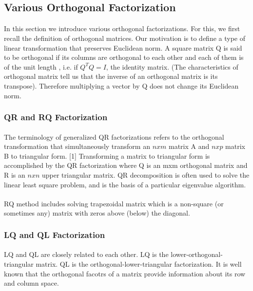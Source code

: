 \documentclass[pdftex,12pt,a4paper]{article}
\begin{document}
\subsection{Various Orthogonal Factorization}
\paragraph{}
In this section we introduce various orthogonal factorizations. For this, we first recall the definition of orthogonal matrices.
 Our motivation is to define a type of linear transformation that preserves Euclidean norm. A square matrix Q is said to be orthogonal if its columns are orthogonal to each other and each of them is of the unit length , i.e. if $Q^{T}Q=I$, the identity matrix. (The characteristics of orthogonal matrix tell us that the inverse of an orthogonal matrix is its transpose). Therefore multiplying a vector by Q does not change its Euclidean norm.          

\subsubsection{QR and RQ Factorization}
\paragraph{}
The terminology of generalized QR factorizations refers to the orthogonal transformation that simultaneously transform an $n x m$ matrix A and $n x p$ matrix B to triangular form. [1] Transforming a matrix  to triangular form is accomplished by the QR factorization where Q is an mxm orthogonal matrix and R is an $n x n$ upper triangular matrix. QR decomposition is often used to solve the linear least square problem, and is the basis of a particular eigenvalue algorithm.
\paragraph{}
 RQ method includes solving trapezoidal matrix which is a non-square (or sometimes any) matrix with zeros above (below) the diagonal. 

\subsubsection{LQ and QL  Factorization}
\paragraph{}
LQ and QL are closely related to each other. LQ is the lower-orthogonal-triangular matrix. QL is the orthogonal-lower-triangular factorization. It is well known that the orthogonal facotrs of  a matrix provide information about its row and column space. 
\end{document}
